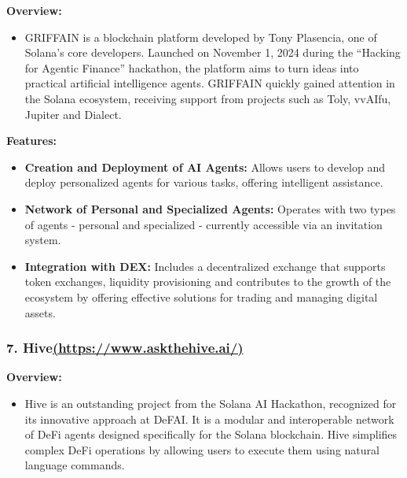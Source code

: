 \documentclass[
]{article}
\providecommand{\tightlist}{%
  \setlength{\itemsep}{0pt}\setlength{\parskip}{0pt}}
\begin{document}
\textbf{Overview:}

\begin{itemize}
\tightlist
\item
  GRIFFAIN is a blockchain platform developed by Tony Plasencia, one of
  Solana's core developers. Launched on November 1, 2024 during the
  ``Hacking for Agentic Finance'' hackathon, the platform aims to turn
  ideas into practical artificial intelligence agents. GRIFFAIN quickly
  gained attention in the Solana ecosystem, receiving support from
  projects such as Toly, vvAIfu, Jupiter and Dialect.
\end{itemize}

\textbf{Features:}

\begin{itemize}
\tightlist
\item
  \textbf{Creation and Deployment of AI Agents:} Allows users to develop
  and deploy personalized agents for various tasks, offering intelligent
  assistance.
\item
  \textbf{Network of Personal and Specialized Agents:} Operates with two
  types of agents - personal and specialized - currently accessible via
  an invitation system.
\item
  \textbf{Integration with DEX:} Includes a decentralized exchange that
  supports token exchanges, liquidity provisioning and contributes to
  the growth of the ecosystem by offering effective solutions for
  trading and managing digital assets.
\end{itemize}

\hypertarget{hivehttpswww.askthehive.ai}{%
\subsubsection{\texorpdfstring{7.
Hive\href{https://www.askthehive.ai/}{(https://www.askthehive.ai/)}}{7. Hive(https://www.askthehive.ai/)}}\label{hivehttpswww.askthehive.ai}}

\textbf{Overview:}

\begin{itemize}
\tightlist
\item
  Hive is an outstanding project from the Solana AI Hackathon,
  recognized for its innovative approach at DeFAI. It is a modular and
  interoperable network of DeFi agents designed specifically for the
  Solana blockchain. Hive simplifies complex DeFi operations by allowing
  users to execute them using natural language commands.
\end{itemize}
\end{document}
